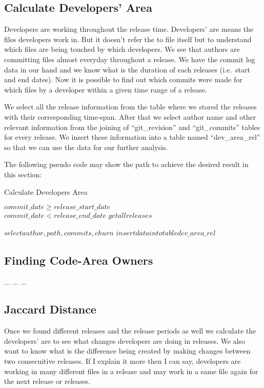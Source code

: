 \documentclass{acm_proc_article-sp}
\begin{document}
\subsection{Calculate Developers' Area}
Developers are working throughout the release time. Developers' are means the files developers work in. But it doesn't refer the to file itself but to understand which files are being touched by which developers. We see that authors are committing files almost everyday throughout a release. We have the commit log data in our hand and we know what is the duration of each releases (i.e.\ start and end dates). Now it is possible to find out which commits were made for which files by a developer within a given time range of a release.

We select all the release information from the table where we stored the releases with their corresponding time-span. After that we select author name and other relevant information from the joining of ``git\_revision'' and ``git\_commits'' tables for every release. We insert these information into a table named ``dev\_area\_rel'' so that we can use the data for our further analysis.

The following pseudo code may show the path to achieve the desired result in this section:

\begin{algorithm}
\caption{Calculate Developers Area}
\begin{algorithmic}
\REQUIRE $ $\\
$commit\_date \geq  release\_start\_date$\\
$commit\_date < release\_end\_date$
\ENSURE
\STATE $get all releases$

		\STATE $select author, path, commits, churn$
		\STATE $insert data into table dev\_area\_rel$
	\ENDIF
\ENDIF
\ENDWHILE
\end{algorithmic}
\end{algorithm}

\subsection{Finding Code-Area Owners}
... ... ...

\subsection{Jaccard Distance}
Once we found different releases and the release periods as well we calculate the developers' are to see what changes developers are doing in releases. We also want to know what is the difference being created by making changes between two consecuitive releases. If I explain it more then I can say, developers are working in many different files in a release and may work in a same file again for the next release or releases. 
\end{document}
